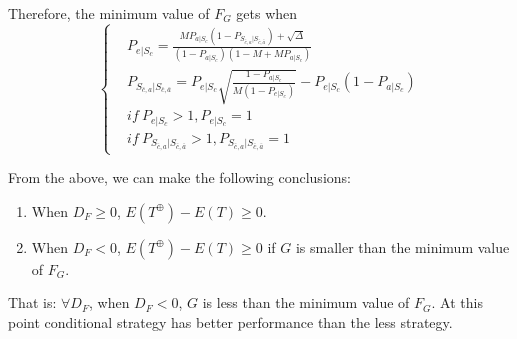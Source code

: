 Therefore, the minimum value of $F_G$ gets when
\begin{equation}
\left\{
\begin{split}
&P_{e|S_{c}} = \frac{MP_{a|S_{c}}(1-P_{S_{\bar{c}, a}|S_{\bar{c},\bar{a}}})+\sqrt{\Delta}}{(1-P_{a|S_{c}})(1-M+MP_{a|S_{c}})} \\
&P_{S_{\bar{c}, a}|S_{\bar{c},\bar{a}}} = P_{e|S_{c}}\sqrt{\frac{1-P_{a|S_{c}}}{M(1-P_{e|S_{c}})}}-P_{e|S_{c}}(1-P_{a|S_{c}}) \\
& if\  P_{e|S_{c}} >1, P_{e|S_{c}} = 1 \\
& if\  P_{S_{\bar{c}, a}|S_{\bar{c},\bar{a}}} >1, P_{S_{\bar{c}, a}|S_{\bar{c},\bar{a}}} = 1
\end{split}
\right.
\end{equation}

From the above, we can make the following conclusions:
\begin{enumerate}
  \item
  When $D_F \geq 0$, $E(T^{\oplus}) - E(T) \geq 0$.
  \item
  When $D_F < 0$, $E(T^{\oplus}) - E(T) \geq 0$ if $G$ is smaller than the minimum value of $F_G$.
\end{enumerate}

That is:
$\forall D_F$, when  $D_F < 0$, $G$ is less than the minimum value of $F_G$.
At this point conditional {\vwarm} strategy has better performance than the less {\vwarm} strategy.




